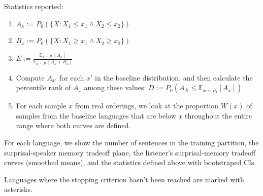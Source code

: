 \documentclass[11pt,letterpaper]{article}
\newcommand{\E}[0]{\mathbb{E}}
\begin{document}
Statistics reported:

\begin{enumerate}
	\item $A_x := P_0(\{X : X_1 \leq x_1 \wedge X_2 \leq x_2\})$
	\item $B_x := P_0(\{X : X_1 \geq x_1 \wedge X_2 \geq x_2\})$
	\item  $E := \frac{\E_{x \sim P_1}[A_x]}{\E_{x \sim P_1}[A_x+B_x]}$
	\item Compute $A_{x'}$ for each $x'$ in the baseline distribution, and then calculate the percentile rank of $A_x$ among these values:
$D := P_0(A_X \leq \E_{x \sim P_1}[A_x])$
\item For each sample $x$ from real orderings, we look at the proportion $W(x)$ of samples from the baseline languages that are below $x$ throughout the entire range where both curves are defined.

\end{enumerate}


For each language, we show the number of sentences in the training partition, the surprisal-speaker memory tradeoff plane, the listener's surprisal-memory tradeoff curves (smoothed means), and the statistics defined above with bootstraped CIs.

Languages where the stopping criterion hasn't been reached are marked with asterisks.
\end{document}
